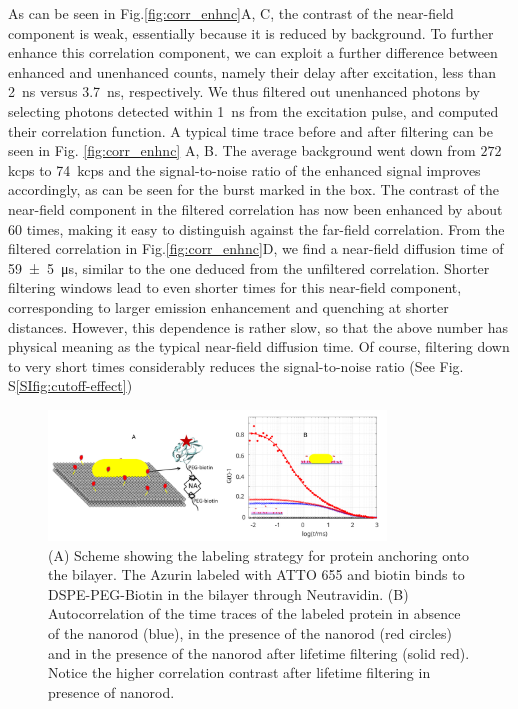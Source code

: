 As can be seen in Fig.\ref{fig:corr_enhnc}A, C, the contrast of the near-field component is weak, essentially because it is reduced by background.
To further enhance this correlation component, we can exploit a further difference between enhanced and unenhanced counts, namely their delay after excitation, less than \SI{2}{\ns} 
versus \SI{3.7}{\ns}, respectively.
We thus filtered out unenhanced photons by selecting photons detected within \SI{1}{\ns} from the excitation pulse, and computed their correlation function.
A typical time trace before and after filtering can be seen in Fig. \ref{fig:corr_enhnc} A, B.
The average background went down from $272~$kcps to \SI{74}{kcps}  and the signal-to-noise ratio of the enhanced signal improves accordingly, as can be seen for the burst marked in the box. 
The contrast of the near-field component in the filtered correlation has now been enhanced by about 60 times, making it easy to distinguish against the far-field correlation.
From the filtered correlation in Fig.\ref{fig:corr_enhnc}D, we find a near-field diffusion time of \SI[separate-uncertainty = true]{59(5)}{\us}, similar to the one deduced from the unfiltered correlation.
Shorter filtering windows lead to even shorter times for this near-field component, corresponding to larger emission enhancement and quenching at shorter distances.
However, this dependence is rather slow, so that the above number has physical meaning as the typical near-field diffusion time.
Of course, filtering down to very short times considerably reduces the signal-to-noise ratio (See Fig. S\ref{SIfig:cutoff-effect})
\begin{figure}[ht]
	\centering
	\includegraphics[width=0.8\textwidth]{Zn_azurin_efcs}
	\caption{(A) Scheme showing the labeling strategy for protein anchoring onto the bilayer.
	The Azurin labeled with ATTO 655 and biotin binds to DSPE-PEG-Biotin in the bilayer through Neutravidin.
	(B) Autocorrelation of the time traces of the labeled protein in absence of the nanorod (blue), in the presence of the nanorod (red circles) 
	and in the presence of the nanorod after lifetime filtering (solid red).
	Notice the higher correlation contrast after lifetime filtering in presence of nanorod.}
	\label{fig:Zn_azurin_efcs}
\end{figure}

